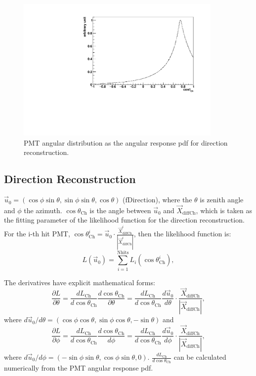 \begin{figure}[!htb]
	\centering
	\includegraphics[width=10cm]{MPW_angularPDF.pdf}
	\caption{PMT angular distribution as the angular response pdf for direction reconstruction.}
	\label{MPW_angularPDF}
\end{figure}

\subsection{Direction Reconstruction}
 $\vec{u}_{0}=(\cos\phi\sin\theta,\sin\phi\sin\theta,\cos\theta)$ ($\mathrm{fDirection}$), where the $\theta$ is zenith angle and $\phi$ the azimuth. $\cos\theta_{\mathrm{Ch}}$ is the angle between $\vec{u}_{0}$ and $\vec{X}_{{\mathrm{diffCh}}}$, which is taken as the fitting parameter of the likelihood function for the direction reconstruction. For the i-th hit PMT, $\cos\theta^i_{\mathrm{Ch}}=\vec{u}_0\cdot\frac{\vec{X}^i_{{\mathrm{diffCh}}}}{|\vec{X}^i_{{\mathrm{diffCh}}}|}$, then the likelihood function is:
\[
L(\vec{u}_0)=\sum_{i=1}^{{\mathrm{Nhits}}}L_i(\cos\theta_{\mathrm{Ch}}^i),
\]

The derivatives have explicit mathematical forms:
\[
\frac{\partial L}{\partial\theta}=\frac{dL_{\mathrm{Ch}}}{d\cos\theta_{\mathrm{Ch}}}\frac{d\cos\theta_{\mathrm{Ch}}}{\partial\theta}
=\frac{dL_{\mathrm{Ch}}}{d\cos\theta_{\mathrm{Ch}}}\frac{d\vec{u}_0}{d\theta}\cdot\frac{\vec{X}_{{\mathrm{diffCh}}}}{|\vec{X}_{{\mathrm{diffCh}}}|},
\]
where $d\vec{u}_0/d\theta=(\cos\phi\cos\theta, \sin\phi\cos\theta, -\sin\theta)$ and 
\[
\frac{\partial　L}{\partial\phi}=\frac{dL_{\mathrm{Ch}}}{d\cos\theta_{\mathrm{Ch}}}\frac{d\cos\theta_{\mathrm{Ch}}}{d\phi}
=\frac{dL_{\mathrm{Ch}}}{d\cos\theta_{\mathrm{Ch}}}\frac{d\vec{u}_0}{d\phi}\cdot\frac{\vec{X}_{{\mathrm{diffCh}}}}{|\vec{X}_{{\mathrm{diffCh}}}|},
\] where $d\vec{u}_0/d\phi=(-\sin\phi\sin\theta, \cos\phi\sin\theta, 0)$. $\frac{dL_{\mathrm{Ch}}}{d\cos\theta_{\mathrm{Ch}}}$ can be calculated numerically from the PMT angular response pdf.

